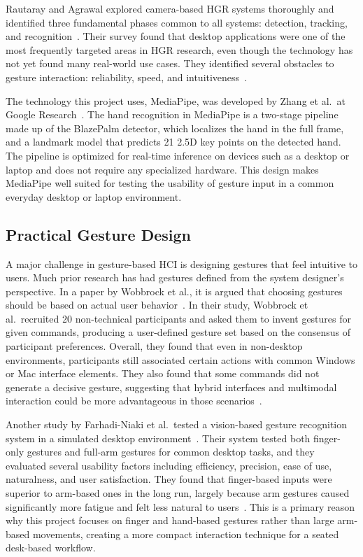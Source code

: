 \documentclass[sigconf]{acmart}
\begin{document}
Rautaray and Agrawal explored camera-based HGR systems thoroughly and identified three fundamental phases common to all systems: detection, tracking, and recognition~\cite{rautaray2015}. Their survey found that desktop applications were one of the most frequently targeted areas in HGR research, even though the technology has not yet found many real-world use cases. They identified several obstacles to gesture interaction: reliability, speed, and intuitiveness~\cite{rautaray2015}.

The technology this project uses, MediaPipe, was developed by Zhang et al.\ at Google Research~\cite{zhang2020}. The hand recognition in MediaPipe is a two-stage pipeline made up of the BlazePalm detector, which localizes the hand in the full frame, and a landmark model that predicts 21 2.5D key points on the detected hand. The pipeline is optimized for real-time inference on devices such as a desktop or laptop and does not require any specialized hardware. This design makes MediaPipe well suited for testing the usability of gesture input in a common everyday desktop or laptop environment.

\subsection{Practical Gesture Design}

A major challenge in gesture-based HCI is designing gestures that feel intuitive to users. Much prior research has had gestures defined from the system designer's perspective. In a paper by Wobbrock et al., it is argued that choosing gestures should be based on actual user behavior~\cite{wobbrock2009}. In their study, Wobbrock et al.\ recruited 20 non-technical participants and asked them to invent gestures for given commands, producing a user-defined gesture set based on the consensus of participant preferences. Overall, they found that even in non-desktop environments, participants still associated certain actions with common Windows or Mac interface elements. They also found that some commands did not generate a decisive gesture, suggesting that hybrid interfaces and multimodal interaction could be more advantageous in those scenarios~\cite{wobbrock2009}.

Another study by Farhadi-Niaki et al.\ tested a vision-based gesture recognition system in a simulated desktop environment~\cite{farhadi2013}. Their system tested both finger-only gestures and full-arm gestures for common desktop tasks, and they evaluated several usability factors including efficiency, precision, ease of use, naturalness, and user satisfaction. They found that finger-based inputs were superior to arm-based ones in the long run, largely because arm gestures caused significantly more fatigue and felt less natural to users~\cite{farhadi2013}. This is a primary reason why this project focuses on finger and hand-based gestures rather than large arm-based movements, creating a more compact interaction technique for a seated desk-based workflow.
\end{document}
